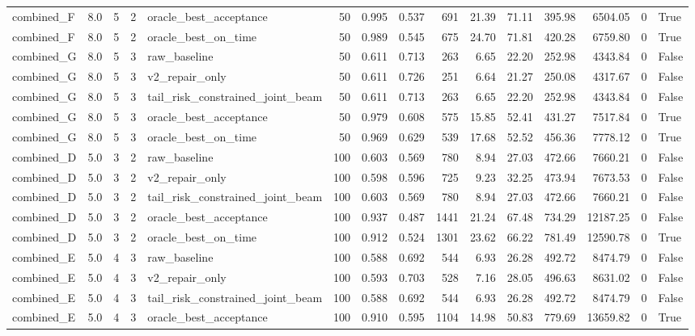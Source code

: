 \begin{table}[htbp]
\begin{tabular}{llrrlrrrrrrrrrl}
combined\_F & 8.0 & 5 & 2 & oracle\_best\_acceptance & 50 & 0.995 & 0.537 & 691 & 21.39 & 71.11 & 395.98 & 6504.05 & 0 & True \\
combined\_F & 8.0 & 5 & 2 & oracle\_best\_on\_time & 50 & 0.989 & 0.545 & 675 & 24.70 & 71.81 & 420.28 & 6759.80 & 0 & True \\
combined\_G & 8.0 & 5 & 3 & raw\_baseline & 50 & 0.611 & 0.713 & 263 & 6.65 & 22.20 & 252.98 & 4343.84 & 0 & False \\
combined\_G & 8.0 & 5 & 3 & v2\_repair\_only & 50 & 0.611 & 0.726 & 251 & 6.64 & 21.27 & 250.08 & 4317.67 & 0 & False \\
combined\_G & 8.0 & 5 & 3 & tail\_risk\_constrained\_joint\_beam & 50 & 0.611 & 0.713 & 263 & 6.65 & 22.20 & 252.98 & 4343.84 & 0 & False \\
combined\_G & 8.0 & 5 & 3 & oracle\_best\_acceptance & 50 & 0.979 & 0.608 & 575 & 15.85 & 52.41 & 431.27 & 7517.84 & 0 & True \\
combined\_G & 8.0 & 5 & 3 & oracle\_best\_on\_time & 50 & 0.969 & 0.629 & 539 & 17.68 & 52.52 & 456.36 & 7778.12 & 0 & True \\
combined\_D & 5.0 & 3 & 2 & raw\_baseline & 100 & 0.603 & 0.569 & 780 & 8.94 & 27.03 & 472.66 & 7660.21 & 0 & False \\
combined\_D & 5.0 & 3 & 2 & v2\_repair\_only & 100 & 0.598 & 0.596 & 725 & 9.23 & 32.25 & 473.94 & 7673.53 & 0 & False \\
combined\_D & 5.0 & 3 & 2 & tail\_risk\_constrained\_joint\_beam & 100 & 0.603 & 0.569 & 780 & 8.94 & 27.03 & 472.66 & 7660.21 & 0 & False \\
combined\_D & 5.0 & 3 & 2 & oracle\_best\_acceptance & 100 & 0.937 & 0.487 & 1441 & 21.24 & 67.48 & 734.29 & 12187.25 & 0 & False \\
combined\_D & 5.0 & 3 & 2 & oracle\_best\_on\_time & 100 & 0.912 & 0.524 & 1301 & 23.62 & 66.22 & 781.49 & 12590.78 & 0 & True \\
combined\_E & 5.0 & 4 & 3 & raw\_baseline & 100 & 0.588 & 0.692 & 544 & 6.93 & 26.28 & 492.72 & 8474.79 & 0 & False \\
combined\_E & 5.0 & 4 & 3 & v2\_repair\_only & 100 & 0.593 & 0.703 & 528 & 7.16 & 28.05 & 496.63 & 8631.02 & 0 & False \\
combined\_E & 5.0 & 4 & 3 & tail\_risk\_constrained\_joint\_beam & 100 & 0.588 & 0.692 & 544 & 6.93 & 26.28 & 492.72 & 8474.79 & 0 & False \\
combined\_E & 5.0 & 4 & 3 & oracle\_best\_acceptance & 100 & 0.910 & 0.595 & 1104 & 14.98 & 50.83 & 779.69 & 13659.82 & 0 & True \\

\end{tabular}
\end{table}

